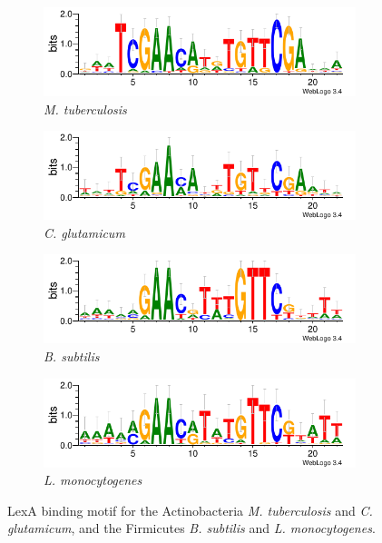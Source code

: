 \documentclass[12pt]{article}
\begin{document}
\begin{figure}
  \centering

  \begin{subfigure}{0.4\textwidth}
    \includegraphics[width=\textwidth]{figures/chapter4/mtuberculosis_motif}
    \caption{\textit{M. tuberculosis}}
  \end{subfigure}
  \begin{subfigure}{0.4\textwidth}
    \includegraphics[width=\textwidth]{figures/chapter4/cglutamicum_motif}
    \caption{\textit{C. glutamicum}}
  \end{subfigure}

  \begin{subfigure}{0.4\textwidth}
    \includegraphics[width=\textwidth]{figures/chapter4/bsubtilis_motif}
    \caption{\textit{B. subtilis}}
  \end{subfigure}
  \begin{subfigure}{0.4\textwidth}
    \includegraphics[width=\textwidth]{figures/chapter4/lmonocytogenes_motif}
    \caption{\textit{L. monocytogenes}}
  \end{subfigure}
  \caption{LexA binding motif for the Actinobacteria \textit{M. tuberculosis}
    and \textit{C. glutamicum}, and the Firmicutes \textit{B. subtilis} and
    \textit{L. monocytogenes}.}
  \label{fig:gram-positive-motifs}
\end{figure}
\end{document}
